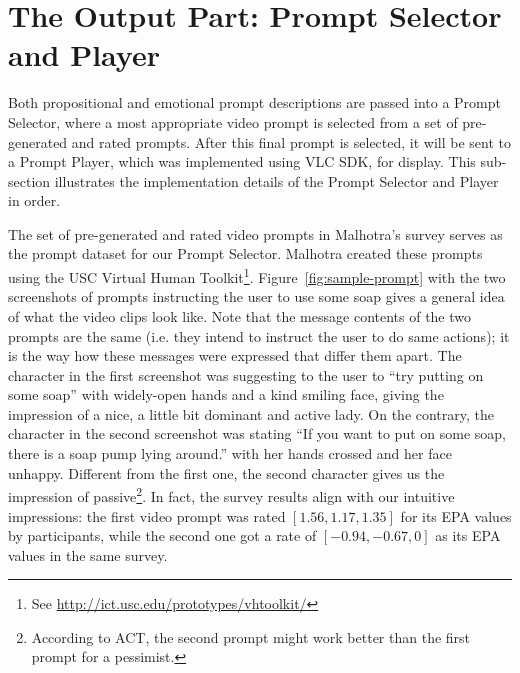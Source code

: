 \section{The Output Part: Prompt Selector and Player}
\label{sec:impl-output}

Both propositional and emotional prompt descriptions are passed into a Prompt Selector, where a most appropriate video prompt is selected from a set of pre-generated and rated prompts. After this final prompt is selected, it will be sent to a Prompt Player, which was implemented using VLC SDK, for display. This sub-section illustrates the implementation details of the Prompt Selector and Player in order.

The set of pre-generated and rated video prompts in Malhotra's survey \cite{malhotra2014} serves as the prompt dataset for our Prompt Selector. Malhotra created these prompts using the USC Virtual Human Toolkit\footnote{See \url{http://ict.usc.edu/prototypes/vhtoolkit/}}. Figure~\ref{fig:sample-prompt} with the two screenshots of prompts instructing the user to use some soap gives a general idea of what the video clips look like. Note that the message contents of the two prompts are the same (i.e. they intend to instruct the user to do same actions); it is the way how these messages were expressed that differ them apart. The character in the first screenshot was suggesting to the user to ``try putting on some soap'' with widely-open hands and a kind smiling face, giving the impression of a nice, a little bit dominant and active lady. On the contrary, the character in the second screenshot was stating ``If you want to put on some soap, there is a soap pump lying around.'' with her hands crossed and her face unhappy. Different from the first one, the second character gives us the impression of passive\footnote{According to ACT, the second prompt might work better than the first prompt for a pessimist.}. In fact, the survey results align with our intuitive impressions: the first video prompt was rated $[1.56, 1.17, 1.35]$ for its EPA values by participants, while the second one got a rate of  $[-0.94, -0.67, 0]$ as its EPA values in the same survey.


